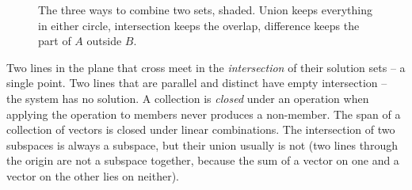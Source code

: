 \begin{figure}[H]
\centering
{}
\caption{The three ways to combine two sets, shaded. Union keeps everything in either
circle, intersection keeps the overlap, difference keeps the part of $A$ outside $B$.}
\label{ch38:venn}
\end{figure}

Two lines in the plane that cross meet in
the \emph{intersection} of their solution sets -- a single point. Two lines that are
parallel and distinct have empty intersection -- the system has no solution. A collection
is \emph{closed} under an operation when applying the operation to members never produces
a non-member. The span of a collection of vectors is closed under linear
combinations. The intersection of two subspaces is always a subspace, but their union
usually is not (two lines through the origin are not a subspace together, because the sum
of a vector on one and a vector on the other lies on neither).

